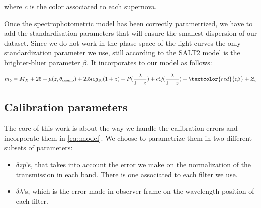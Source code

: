 \documentclass[\docopts]{\docclass}
\begin{document}
where $c$ is the color associated to each supernova.


Once the spectrophotometric model has been correctly parametrized, we have to add the standardisation parameters that will ensure the smallest dispersion of our dataset.
Since we do not work in the phase space of the light curves the only standardization parameter we use, still according to the SALT2 model is the brighter-bluer parameter $\beta$.
It incorporates to our model as follows:
\begin{equation}
\label{eq::model}
m_b = M_X + 25 + \mu(z, \theta_\text{cosmo}) + 2.5log_{10}(1+z) + P(\frac{\bar \lambda}{1+z}) + cQ(\frac{\bar \lambda}{1+z}) + \textcolor{red}{c\beta}+ \mathcal{Z}_b
\end{equation}


\subsection{Calibration parameters}
\label{sec::calib_uncertainties}
The core of this work is about the way we handle the calibration errors and incorporate them in \ref{eq::model}.
We choose to parametrize them in two different subsets of parameters:
\begin{itemize}
\item $\delta zp$'s, that takes into account the error we make on the normalization of the transmission in each band.
There is one associated to each filter we use.
\item $\delta \lambda$'s, which is the error made in observer frame on the wavelength position of each filter. 
\end{itemize}
\end{document}
